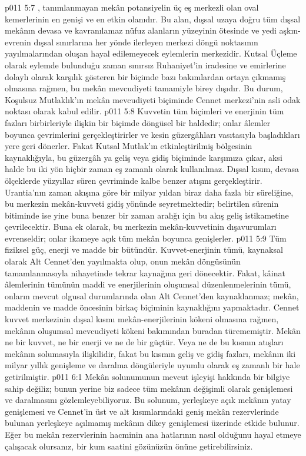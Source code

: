 \vs p011 5:7 , tanımlanmayan mekân potansiyelin üç eş merkezli olan oval kemerlerinin en genişi ve en etkin olanıdır. Bu alan, dışsal uzaya doğru tüm dışsal mekânın devasa ve kavranılamaz nüfuz alanların yüzeyinin ötesinde ve yedi aşkın\hyp{}evrenin dışsal sınırlarına her yönde ilerleyen merkezi döngü noktasının yayılmalarından oluşan hayal edilemeyecek eylemlerin merkezidir. Kutsal Üçleme olarak eylemde bulunduğu zaman sınırsız Ruhaniyet’in iradesine ve emirlerine dolaylı olarak karşılık gösteren bir biçimde bazı bakımlardan ortaya çıkmamış olmasına rağmen, bu mekân mevcudiyeti tamamiyle birey dışıdır. Bu durum, Koşulsuz Mutlaklık’ın mekân mevcudiyeti biçiminde Cennet merkezi’nin asli odak noktası olarak kabul edilir.
\vs p011 5:8 Kuvvetin tüm biçimleri ve enerjinin tüm fazları birbirleriyle ilişkin bir biçimde döngüsel bir haldedir; onlar âlemler boyunca çevrimlerini gerçekleştirirler ve kesin güzergâhları vasıtasıyla başladıkları yere geri dönerler. Fakat Kutsal Mutlak’ın etkinleştirilmiş bölgesinin kaynaklığıyla, bu güzergâh ya geliş veya gidiş biçiminde karşımıza çıkar, aksi halde bu iki yön hiçbir zaman eş zamanlı olarak kullanılmaz. Dışsal kısım, devasa ölçeklerde yüzyıllar süren çevriminde kalbe benzer atışını gerçekleştirir. Urantia’nın zaman akışına göre bir milyar yıldan biraz daha fazla bir süreliğine, bu merkezin mekân\hyp{}kuvveti gidiş yönünde seyretmektedir; belirtilen sürenin bitiminde ise yine buna benzer bir zaman aralığı için bu akış geliş istikametine çevrilecektir. Buna ek olarak, bu merkezin mekân\hyp{}kuvvetinin dışavurumları evrenseldir; onlar ikameye açık tüm mekân boyunca genişlerler.
\vs p011 5:9 Tüm fiziksel güç, enerji ve madde bir bütündür. Kuvvet\hyp{}enerjinin tümü, kaynaksal olarak Alt Cennet’den yayılmakta olup, onun mekân döngüsünün tamamlanmasıyla nihayetinde tekrar kaynağına geri dönecektir. Fakat, kâinat âlemlerinin tümünün maddi ve enerjilerinin oluşumsal düzenlenmelerinin tümü, onların mevcut olgusal durumlarında olan Alt Cennet’den kaynaklanmaz; mekân, maddenin ve madde öncesinin birkaç biçiminin kaynaklığını yapmaktadır. Cennet kuvvet merkezinin dışsal kısmı mekân\hyp{}enerjilerinin kökeni olmasına rağmen, mekânın oluşumsal mevcudiyeti kökeni bakımından buradan türememiştir. Mekân ne bir kuvvet, ne bir enerji ve ne de bir güçtür. Veya ne de bu kısmın atışları mekânın solumasıyla ilişkilidir, fakat bu kısmın geliş ve gidiş fazları, mekânın iki milyar yıllık genişleme ve daralma döngüleriyle uyumlu olarak eş zamanlı bir hale getirilmiştir.
\vs p011 6:1 Mekân solunumunun mevcut işleyişi hakkında bir bilgiye sahip değiliz; bunun yerine biz sadece tüm mekânın değişimli olarak genişlemesi ve daralmasını gözlemleyebiliyoruz. Bu solunum, yerleşkeye açık mekânın yatay genişlemesi ve Cennet’in üst ve alt kısımlarındaki geniş mekân rezervlerinde bulunan yerleşkeye açılmamış mekânın dikey genişlemesi üzerinde etkide bulunur. Eğer bu mekân rezervlerinin hacminin ana hatlarının nasıl olduğunu hayal etmeye çalışacak olursanız, bir kum saatini gözünüzün önüne getirebilirsiniz.
